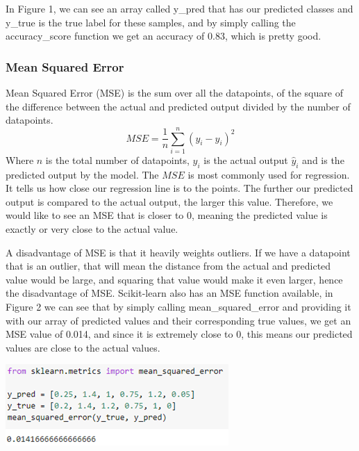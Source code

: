 \documentclass[a4paper,12pt]{report}
\begin{document}
In Figure 1, we can see an array called y\_pred that has our predicted classes and y\_true is the true label for these samples, and by simply calling the accuracy\_score function we get an accuracy of 0.83, which is pretty good.

\subsubsection{Mean Squared Error}

Mean Squared Error (MSE) is the sum over all the datapoints, of the square of the difference between the actual and predicted output divided by the number of datapoints.
$$MSE=\frac{1}{n}\sum_{i=1}^n(y_i-\hat{y}_i)^2$$
Where $n$ is the total number of datapoints, $y_i$ is the actual output $\hat{y}_i$ and  is the predicted output by the model. The $MSE$ is most commonly used for regression. It tells us how close our regression line is to the points. The further our predicted output is compared to the actual output, the larger this value. Therefore, we would like to see an MSE that is closer to 0, meaning the predicted value is exactly or very close to the actual value.

A disadvantage of MSE is that it heavily weights outliers. If we have a datapoint that is an outlier, that will mean the distance from the actual and predicted value would be large, and squaring that value would make it even larger, hence the disadvantage of MSE. Scikit-learn also has an MSE function available, in Figure 2 we can see that by simply calling mean\_squared\_error and providing it with our array of predicted values and their corresponding true values, we get an MSE value of 0.014, and since it is extremely close to 0, this means our predicted values are close to the actual values.

\begin{center}
    \captionsetup{type=figure}
    \includegraphics[width=.9\linewidth]{media/MSEcode.png}
\end{center}
\end{document}
